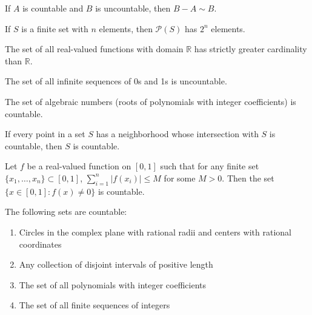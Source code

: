 \begin{theorem}
If $A$ is countable and $B$ is uncountable, then $B - A \sim B$.
\end{theorem}

\begin{theorem}
If $S$ is a finite set with $n$ elements, then $\mathcal{P}(S)$ has $2^n$ elements.
\end{theorem}

\begin{theorem}
The set of all real-valued functions with domain $\mathbb{R}$ has strictly greater cardinality than $\mathbb{R}$.
\end{theorem}

\begin{theorem}
The set of all infinite sequences of 0s and 1s is uncountable.
\end{theorem}

\begin{theorem}
The set of algebraic numbers (roots of polynomials with integer coefficients) is countable.
\end{theorem}

\begin{theorem}
If every point in a set $S$ has a neighborhood whose intersection with $S$ is countable, then $S$ is countable.
\end{theorem}

\begin{theorem}
Let $f$ be a real-valued function on $[0,1]$ such that for any finite set $\{x_1, \ldots, x_n\} \subset [0,1]$, $\sum_{i=1}^n |f(x_i)| \leq M$ for some $M > 0$. Then the set $\{x \in [0,1] : f(x) \neq 0\}$ is countable.
\end{theorem}

\begin{theorem}
The following sets are countable:
\begin{enumerate}
\item Circles in the complex plane with rational radii and centers with rational coordinates
\item Any collection of disjoint intervals of positive length
\item The set of all polynomials with integer coefficients
\item The set of all finite sequences of integers
\end{enumerate}
\end{theorem}

